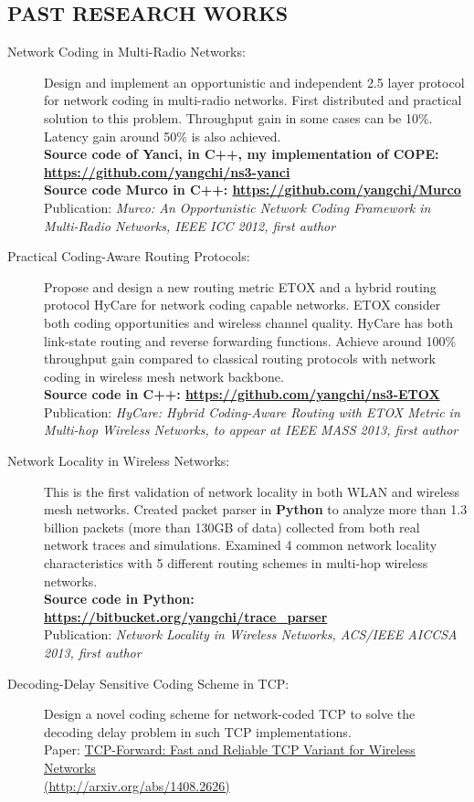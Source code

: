 \documentclass[line]{res}
\begin{document}
\begin{resume}
	\section{PAST RESEARCH WORKS}
	\begin{description}
		\item[Network Coding in Multi-Radio Networks:] 
			Design and implement an opportunistic and independent 2.5 layer protocol for network coding in multi-radio networks. First distributed and practical solution to this problem. Throughput gain in some cases can be 10\%. Latency gain around 50\% is also achieved. \\
			\textbf{Source code of Yanci, in C++, my implementation of COPE: \url{https://github.com/yangchi/ns3-yanci}} \\
			\textbf{Source code Murco in C++: \url{https://github.com/yangchi/Murco}} \\
			Publication: \emph{Murco: An Opportunistic Network Coding Framework in Multi-Radio Networks, IEEE ICC 2012, first author}
		\item[Practical Coding-Aware Routing Protocols:] 
			Propose and design a new routing metric ETOX and a hybrid routing protocol HyCare for network coding capable networks. ETOX consider both coding opportunities and wireless channel quality. HyCare has both link-state routing and reverse forwarding functions. Achieve around 100\% throughput gain compared to classical routing protocols with network coding in wireless mesh network backbone.\\
			\textbf{Source code in C++: \url{https://github.com/yangchi/ns3-ETOX} } \\
			Publication: \emph{HyCare: Hybrid Coding-Aware Routing with ETOX Metric in Multi-hop Wireless Networks, to appear at IEEE MASS 2013, first author}
		\item[Network Locality in Wireless Networks:] 
			This is the first validation of network locality in both WLAN and wireless mesh networks. Created packet parser in \textbf{Python} to analyze more than 1.3 billion packets (more than 130GB of data) collected from both real network traces and simulations. Examined 4 common network locality characteristics with 5 different routing schemes in multi-hop wireless networks.\\
			\textbf{Source code in Python: \url{https://bitbucket.org/yangchi/trace_parser} } \\
			Publication: \emph{Network Locality in Wireless Networks, ACS/IEEE AICCSA 2013, first author}
		\item [Decoding-Delay Sensitive Coding Scheme in TCP:]
			Design a novel coding scheme for network-coded TCP to solve the decoding delay problem in such TCP implementations. \\
			Paper: \href{http://arxiv.org/abs/1408.2626}{TCP-Forward: Fast and Reliable TCP Variant for Wireless Networks  \\ (http://arxiv.org/abs/1408.2626)}
	\end{description}
	

\end{resume}
\end{document}
